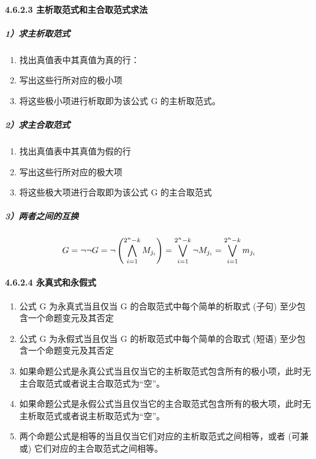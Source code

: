 \paragraph{4.6.2.3
主析取范式和主合取范式求法}\label{ux4e3bux6790ux53d6ux8303ux5f0fux548cux4e3bux5408ux53d6ux8303ux5f0fux6c42ux6cd5}

\subparagraph{1）求主析取范式}\label{ux6c42ux4e3bux6790ux53d6ux8303ux5f0f}

\begin{enumerate}
\def\labelenumi{\arabic{enumi}.}
\tightlist
\item
  找出真值表中其真值为真的行：
\item
  写出这些行所对应的极小项
\item
  将这些极小项进行析取即为该公式 G 的主析取范式。
\end{enumerate}

\subparagraph{2）求主合取范式}\label{ux6c42ux4e3bux5408ux53d6ux8303ux5f0f}

\begin{enumerate}
\def\labelenumi{\arabic{enumi}.}
\tightlist
\item
  找出真值表中其真值为假的行
\item
  写出这些行所对应的极大项
\item
  将这些极大项进行合取即为该公式 G 的主合取范式
\end{enumerate}

\subparagraph{3）两者之间的互换}\label{ux4e24ux8005ux4e4bux95f4ux7684ux4e92ux6362}

\[
\huge 
G=\lnot \lnot G = \lnot \left(\bigwedge\limits_{i=1}^{2^n-k} M_{j_i}\right) = \bigvee\limits_{i=1}^{2^n-k} \lnot M_{j_i} = \bigvee\limits_{i=1}^{2^n-k} m_{j_i}
\]

\paragraph{4.6.2.4
永真式和永假式}\label{ux6c38ux771fux5f0fux548cux6c38ux5047ux5f0f}

\begin{enumerate}
\def\labelenumi{\arabic{enumi})}
\tightlist
\item
  公式 G 为永真式当且仅当 G 的合取范式中每个简单的析取式 (子句)
  至少包含一个命题变元及其否定
\item
  公式 G 为永假式当且仅当 G 的析取范式中每个简单的合取式 (短语)
  至少包含一个命题变元及其否定
\item
  如果命题公式是永真公式当且仅当它的主析取范式包含所有的极小项，此时无主合取范式或者说主合取范式为``空''。
\item
  如果命题公式是永假公式当且仅当它的主合取范式包含所有的极大项，此时无主析取范式或者说主析取范式为``空''。
\item
  两个命题公式是相等的当且仅当它们对应的主析取范式之间相等，或者
  (可兼或) 它们对应的主合取范式之间相等。
\end{enumerate}


